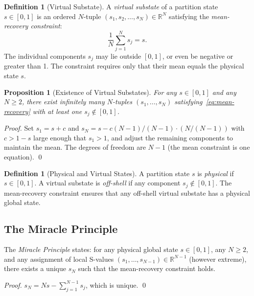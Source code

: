 \documentclass[twocolumn,10pt,a4paper]{article}
\theoremstyle{thmstyle}
\newtheorem{proposition}[theorem]{Proposition}
\theoremstyle{definition}
\newtheorem{definition}[theorem]{Definition}
\theoremstyle{remark}
\newcommand{\R}{\mathbb{R}}
\begin{document}
\begin{definition}[Virtual Substate]
\label{def:virtual}
A \emph{virtual substate} of a partition state $s \in [0,1]$ is an
ordered $N$-tuple $(s_1, s_2, \ldots, s_N) \in \R^N$ satisfying the
\emph{mean-recovery constraint}:
\begin{equation}
\frac{1}{N}\sum_{j=1}^{N} s_j = s.
\label{eq:mean-recovery}
\end{equation}
The individual components $s_j$ may lie outside $[0,1]$, or even be
negative or greater than 1. The constraint requires only that their
mean equals the physical state $s$.
\end{definition}

\begin{proposition}[Existence of Virtual Substates]
For any $s \in [0,1]$ and any $N \geq 2$, there exist infinitely many
$N$-tuples $(s_1,\ldots,s_N)$ satisfying~\eqref{eq:mean-recovery}
with at least one $s_j \notin [0,1]$.
\end{proposition}

\begin{proof}
Set $s_1 = s + c$ and $s_N = s - c(N-1)/(N-1) \cdot (N/(N-1))$
with $c > 1 - s$ large enough that $s_1 > 1$, and adjust the remaining
components to maintain the mean. The degrees of freedom are $N - 1$
(the mean constraint is one equation). \qed
\end{proof}

\begin{definition}[Physical and Virtual States]
A partition state $s$ is \emph{physical} if $s \in [0,1]$.
A virtual substate is \emph{off-shell} if any component $s_j \notin [0,1]$.
The mean-recovery constraint ensures that any off-shell virtual substate
has a physical global state.
\end{definition}

\subsection{The Miracle Principle}

The \emph{Miracle Principle} states: for any physical global state
$s \in [0,1]$, any $N \geq 2$, and any assignment of local S-values
$(s_1, \ldots, s_{N-1}) \in \R^{N-1}$ (however extreme), there exists
a unique $s_N$ such that the mean-recovery constraint holds.

\begin{proof}
$s_N = Ns - \sum_{j=1}^{N-1} s_j$, which is unique. \qed
\end{proof}
\end{document}
